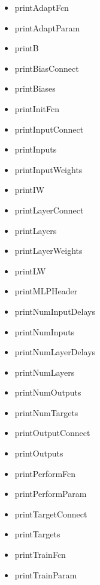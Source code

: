 \begin{itemize}
  \item printAdaptFcn
  \item printAdaptParam
  \item printB
  \item printBiasConnect
  \item printBiases
  \item printInitFcn
  \item printInputConnect
  \item printInputs
  \item printInputWeights
  \item printIW
  \item printLayerConnect
  \item printLayers
  \item printLayerWeights
  \item printLW
  \item printMLPHeader
  \item printNumInputDelays
  \item printNumInputs
  \item printNumLayerDelays
  \item printNumLayers
  \item printNumOutputs
  \item printNumTargets
  \item printOutputConnect
  \item printOutputs
  \item printPerformFcn
  \item printPerformParam
  \item printTargetConnect
  \item printTargets
  \item printTrainFcn
  \item printTrainParam
\end{itemize}